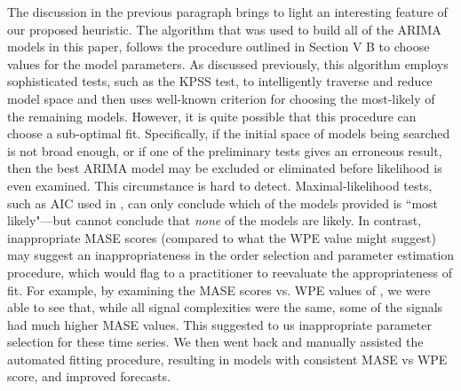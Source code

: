 The discussion in the previous paragraph brings to light an interesting feature of our proposed heuristic. The \arima algorithm that was used to build all of the ARIMA
models in this paper, follows the procedure outlined
in Section V B to choose values for the model parameters.  
As discussed previously, this algorithm employs sophisticated tests, such as the KPSS test, to intelligently traverse and reduce model space and then uses well-known criterion for choosing the most-likely of the remaining models. However, it is quite possible that this procedure can choose a sub-optimal fit. Specifically, if the initial space of models being searched is not broad enough, or if one of the preliminary tests gives an erroneous result, then the best ARIMA model may be excluded or eliminated before likelihood is even examined. This circumstance is hard to detect. Maximal-likelihood  tests, such as AIC used in \arima, can only conclude which of the models provided is ``most likely"---but cannot conclude that \emph{none} of the models are likely. In contrast,  
inappropriate MASE scores (compared to
what the WPE value might suggest) may suggest an inappropriateness in the order selection and parameter estimation procedure, which would flag to a practitioner to reevaluate the appropriateness of fit. For example, 
by examining the \arima MASE scores vs. WPE values of \col, we were able to see that, while all signal complexities were the same, some of the signals had much higher MASE values. This suggested to us inappropriate parameter selection for these time series. We then went back and manually assisted the automated fitting procedure, resulting in models with consistent MASE vs WPE score, and improved forecasts.















